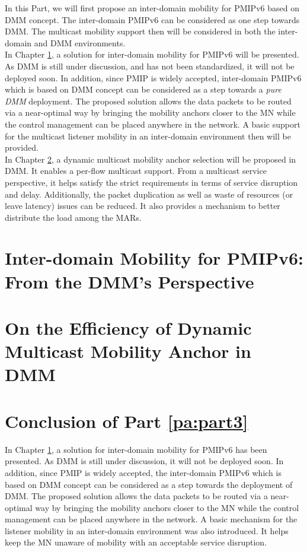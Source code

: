 \documentclass[a4paper,10pt,twoside]{ThesisStyle}
\begin{document}
In this Part, we will first propose an inter-domain mobility for PMIPv6 based on DMM concept. The inter-domain PMIPv6 can be considered as one step towards DMM. The multicast mobility support then will be considered in both the inter-domain and DMM environments. \\

In Chapter \ref{ch:inter_domain}, a solution for inter-domain mobility for PMIPv6 will be presented. As DMM is still under discussion, and has not been standardized, it will not be deployed soon. In addition, since PMIP is widely accepted, inter-domain PMIPv6 which is based on DMM concept can be considered as a step towards a \textit{pure DMM} deployment. The proposed solution allows the data packets to be routed via a near-optimal way by bringing the mobility anchors closer to the MN while the control management can be placed anywhere in the network. A basic support for the multicast listener mobility in an inter-domain environment then will be provided.  \\

In Chapter \ref{ch:multicast_dmm}, a dynamic multicast mobility anchor selection will be proposed in DMM. It enables a per-flow multicast support. From a multicast service perspective, it helps satisfy the strict requirements in terms of service disruption and delay. Additionally, the packet duplication as well as waste of resources (or leave latency) issues can be reduced. It also provides a mechanism to better distribute the load among the MARs. 

\chapter{Inter-domain Mobility for PMIPv6: From the DMM's Perspective} \label{ch:inter_domain}


\chapter{On the Efficiency of Dynamic Multicast Mobility Anchor in DMM} \label{ch:multicast_dmm}

\chapter*{Conclusion of Part \ref{pa:part3}}

In Chapter \ref{ch:inter_domain}, a solution for inter-domain mobility for PMIPv6 has been presented. As DMM is still under discussion, it will not be deployed soon. In addition, since PMIP is widely accepted, the inter-domain PMIPv6 which is based on DMM concept can be considered as a step towards the deployment of DMM. The proposed solution allows the data packets to be routed via a near-optimal way by bringing the mobility anchors closer to the MN while the control management can be placed anywhere in the network. A basic mechanism for the listener mobility in an inter-domain environment was also introduced. It helps keep the MN unaware of mobility with an acceptable service disruption.\\
\end{document}
